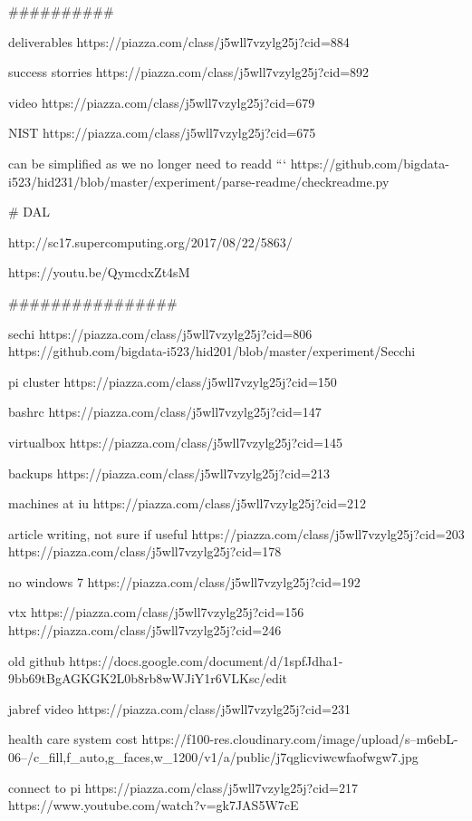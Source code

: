 
##########

deliverables
https://piazza.com/class/j5wll7vzylg25j?cid=884

success storries
https://piazza.com/class/j5wll7vzylg25j?cid=892

video
https://piazza.com/class/j5wll7vzylg25j?cid=679

NIST
https://piazza.com/class/j5wll7vzylg25j?cid=675


can be simplified as we no longer need to readd ```
https://github.com/bigdata-i523/hid231/blob/master/experiment/parse-readme/checkreadme.py



# DAL

http://sc17.supercomputing.org/2017/08/22/5863/

https://youtu.be/QymcdxZt4sM

################


sechi
https://piazza.com/class/j5wll7vzylg25j?cid=806
https://github.com/bigdata-i523/hid201/blob/master/experiment/Secchi%


pi cluster
https://piazza.com/class/j5wll7vzylg25j?cid=150

bashrc
https://piazza.com/class/j5wll7vzylg25j?cid=147

virtualbox
https://piazza.com/class/j5wll7vzylg25j?cid=145

backups
https://piazza.com/class/j5wll7vzylg25j?cid=213

machines at iu
https://piazza.com/class/j5wll7vzylg25j?cid=212

article writing, not sure if useful
https://piazza.com/class/j5wll7vzylg25j?cid=203
https://piazza.com/class/j5wll7vzylg25j?cid=178

no windows 7
https://piazza.com/class/j5wll7vzylg25j?cid=192

vtx
https://piazza.com/class/j5wll7vzylg25j?cid=156
https://piazza.com/class/j5wll7vzylg25j?cid=246



old github
https://docs.google.com/document/d/1spfJdha1-9bb69tBgAGKGK2L0b8rb8wWJiY1r6VLKsc/edit

jabref video
https://piazza.com/class/j5wll7vzylg25j?cid=231

health care system cost
https://f100-res.cloudinary.com/image/upload/s--m6ebL-06--/c_fill,f_auto,g_faces,w_1200/v1/a/public/j7qglicviwcwfaofwgw7.jpg

connect to pi
https://piazza.com/class/j5wll7vzylg25j?cid=217
https://www.youtube.com/watch?v=gk7JAS5W7cE


